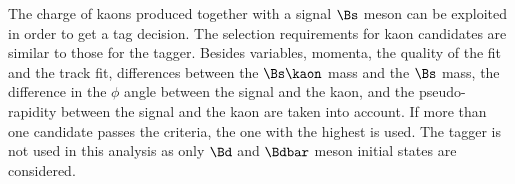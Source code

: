 The charge of kaons produced together with a signal $\Bs$ meson can be exploited
in order to get a tag decision. The selection requirements for kaon candidates
are similar to those for the \SSpi tagger. Besides \PID variables, momenta, the
quality of the \IP fit and the track fit, differences between the $\Bs\kaon$
mass and the $\Bs$ mass, the difference in the $\phi$ angle between the signal
\Bmeson and the kaon, and the pseudo-rapidity between the signal \Bmeson and the
kaon are taken into account. If more than one candidate passes the criteria, the
one with the highest \pT is used. The \SSK tagger is not used in this analysis
as only $\Bd$ and $\Bdbar$ meson initial states are considered.
%

